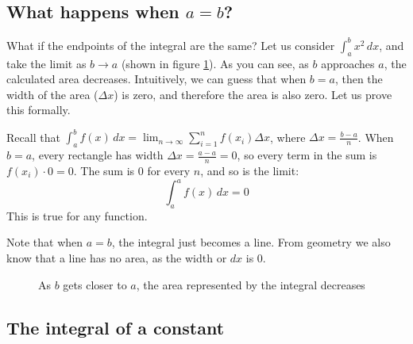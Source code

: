 \subsection{What happens when $a=b$?}

What if the endpoints of the integral are the same? Let us consider 
$\int_a^b x^2\,dx$, and take the limit as $b \to a$ (shown in figure 
\ref{fig:aequalb}). As you can see, as $b$ approaches $a$, the 
calculated area decreases. Intuitively, we can guess that when $b=a$, 
then the width of the area ($\Delta x$) is zero, and therefore the 
area is also zero. Let us prove this formally. 

Recall that $\int_a^b f(x)\,dx = \lim_{n\to \infty} \sum_{i = 1}^{n}
f(x_i)\Delta x$, where $\Delta x = \frac{b - a}{n}$. When $b = a$, every
rectangle has width $\Delta x = \frac{a - a}{n} = 0$, so every term in the
sum is $f(x_i) \cdot 0 = 0$. The sum is 0 for every $n$, and so is the
limit:
$$\int_a^a f(x)\,dx = 0$$
This is true for any function.

Note that when $a=b$, the integral just becomes a line. From geometry we also know that 
a line has no area, as the width or $dx$ is 0. 

\begin{figure}[H]
    \centering
    \caption{As $b$ gets closer to $a$, the area represented by the 
    integral decreases}
    \label{fig:aequalb}
\end{figure}

\subsection{The integral of a constant}

